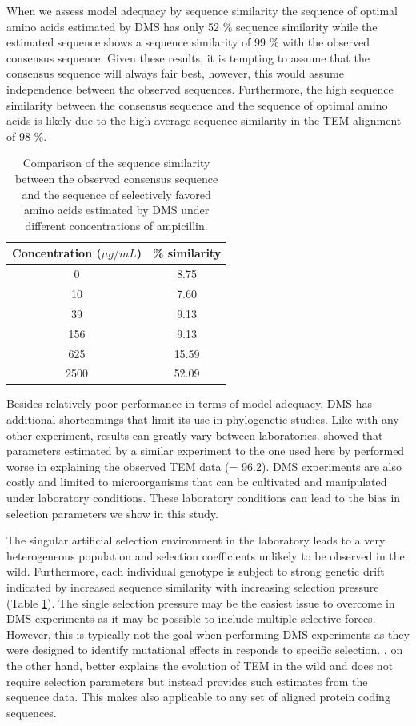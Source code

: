 \documentclass[fleqn,letterpaper]{article}
\begin{document}
When we assess model adequacy by sequence similarity the sequence of optimal amino acids estimated by DMS has only 52 \% sequence similarity while the \selac estimated sequence shows a sequence similarity of 99 \% with the observed consensus sequence.
Given these results, it is tempting to assume that the consensus sequence will always fair best, however, this would assume independence between the observed sequences.
Furthermore, the high sequence similarity between the consensus sequence and the sequence of optimal amino acids is likely due to the high average sequence similarity in the TEM alignment of 98 \%.

\begin{table}
  \centering
  \caption{Comparison of the sequence similarity between the observed consensus sequence and the sequence of selectively favored amino acids estimated by DMS under different concentrations of ampicillin.}  
  \begin{tabular}{cc}
    \hline
    Concentration ($\mu g/mL$)	& \% similarity \\ \hline 
    0								& 8.75  \\
    10 								& 7.60  \\
    39 								& 9.13  \\
    156								& 9.13  \\
    625								& 15.59  \\
    2500							& 52.09  \\ \hline
  \end{tabular}
  \label{tab:seq_sim_conc}
\end{table}

Besides relatively poor performance in terms of model adequacy, DMS has additional shortcomings that limit its use in phylogenetic studies.
Like with any other experiment, results can greatly vary between laboratories.
\citet{hilton2017} showed that parameters estimated by a similar experiment to the one used here by \citet{firnberg2014} performed worse in explaining the observed TEM data (\DeltaAIC = 96.2).
DMS experiments are also costly and limited to microorganisms that can be cultivated and manipulated under laboratory conditions.
These laboratory conditions can lead to the bias in selection parameters we show in this study.

The singular artificial selection environment in the laboratory leads to a very heterogeneous population and selection coefficients unlikely to be observed in the wild.
Furthermore, each individual genotype is subject to strong genetic drift indicated by increased sequence similarity with increasing selection pressure (Table \ref{tab:seq_sim_conc}).
The single selection pressure may be the easiest issue to overcome in DMS experiments as it may be possible to include multiple selective forces.
However, this is typically not the goal when performing DMS experiments as they were designed to identify mutational effects in responds to specific selection.
\selac, on the other hand, better explains the evolution of TEM in the wild and does not require selection parameters but instead provides such estimates from the sequence data.
This makes \selac also applicable to any set of aligned protein coding sequences.
\end{document}
